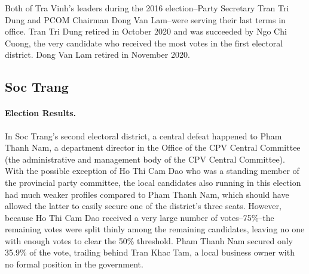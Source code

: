\documentclass[12pt]{article}
\newcommand{\1}{\mathbbm{1}}
\begin{document}
Both of Tra Vinh's leaders during the 2016 election--Party Secretary Tran Tri Dung and PCOM Chairman Dong Van Lam--were serving their last terms in office. Tran Tri Dung retired in October 2020 and was succeeded by Ngo Chi Cuong, the very candidate who received the most votes in the first electoral district. Dong Van Lam retired in November 2020.

\subsection{Soc Trang}

\paragraph{Election Results.} 

In Soc Trang's second electoral district, a central defeat happened to Pham Thanh Nam, a department director in the Office of the CPV Central Committee (the administrative and management body of the CPV Central Committee). With the possible exception of Ho Thi Cam Dao who was a standing member of the provincial party committee, the local candidates also running in this election had much weaker profiles compared to Pham Thanh Nam, which should have allowed the latter to easily secure one of the district's three seats. However, because Ho Thi Cam Dao received a very large number of votes--75\%--the remaining votes were split thinly among the remaining candidates, leaving no one with enough votes to clear the 50\% threshold. Pham Thanh Nam secured only 35.9\% of the vote, trailing behind Tran Khac Tam, a local business owner with no formal position in the government.
\end{document}
